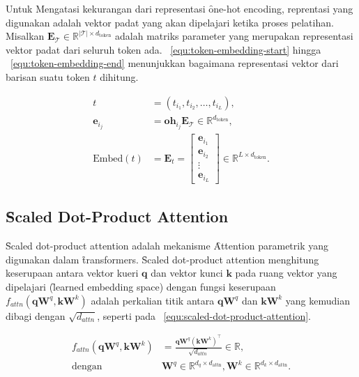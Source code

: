 	Untuk Mengatasi kekurangan dari representasi \f{one-hot encoding}, reprentasi yang digunakan adalah vektor padat yang akan dipelajari ketika proses pelatihan. Misalkan $\mathbf{E}_{\mathcal{T}} \in \mathbb{R}^{|\mathcal{T}| \times d_{\text{token}}}$ adalah matriks parameter yang merupakan representasi vektor padat dari seluruh token ada. \equ~\ref{equ:token-embedding-start} hingga \equ~\ref{equ:token-embedding-end} menunjukkan bagaimana representasi vektor dari barisan suatu token $t$ dihitung. 

	\begin{align}
		\label{equ:token-embedding-start}
		t &= (t_{i_1}, t_{i_2}, \dots, t_{i_L}), \\
		\mathbf{e}_{i_j} &= \mathbf{oh}_{i_j} \mathbf{E}_{\mathcal{T}} \in \mathbb{R}^{d_{\text{token}}}, \\
		\label{equ:token-embedding-end}
		\text{Embed}(t) &= \mathbf{E}_{t} = \begin{bmatrix}
			\mathbf{e}_{i_1} \\
			\mathbf{e}_{i_2} \\
			\vdots \\
			\mathbf{e}_{i_L}
		\end{bmatrix} \in \mathbb{R}^{L \times d_{\text{token}}}.
	\end{align}

	\subsection{\f{Scaled Dot-Product Attention}}
	\label{sec:scaled-dot-product-attention}
	\f{Scaled dot-product attention} adalah mekanisme \f{Attention} parametrik yang digunakan dalam \f{transformers}. \f{Scaled dot-product attention} menghitung keserupaan antara vektor kueri $\mathbf{q}$ dan vektor kunci $\mathbf{k}$ pada ruang vektor yang dipelajari (\f{learned embedding space}) dengan fungsi keserupaan $f_{attn}(\mathbf{q} \mathbf{W}^q, \mathbf{k}\mathbf{W}^k) $ adalah perkalian titik antara $\mathbf{qW}^q$ dan $\mathbf{kW}^k$ yang kemudian dibagi dengan $\sqrt{d_{attn}}$, seperti pada \equ~\ref{equ:scaled-dot-product-attention}.

	\begin{align}
		\label{equ:scaled-dot-product-attention}
		f_{attn}(\mathbf{q} \mathbf{W}^q, \mathbf{k} \mathbf{W}^k) &= \frac{\mathbf{q} \mathbf{W}^q (\mathbf{k} \mathbf{W}^k)^{\top}}{\sqrt{d_{attn}}} \in \mathbb{R}, \\
		\text{dengan } &\mathbf{W}^q \in \mathbb{R}^{d_q \times d_{\text{attn}}}, \mathbf{W}^k \in \mathbb{R}^{d_k \times d_{\text{attn}}}.
	\end{align}

